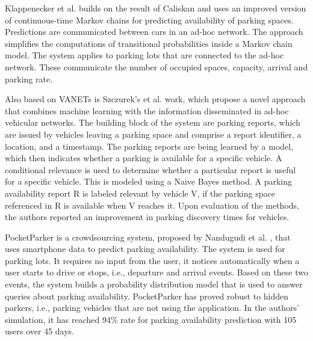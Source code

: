 Klappenecker et al. \cite{klappenecker} builds on the result of Caliskan and uses an improved version of continuous-time Markov chains for predicting availability of parking spaces. Predictions are communicated between cars in an ad-hoc network. The approach simplifies the computations of transitional probabilities inside a Markov chain model. The system applies to parking lots that are connected to the ad-hoc network. These communicate the number of occupied spaces, capacity, arrival and parking rate. 

Also based on VANETs is Szczurek's et al. \cite{szczurek} work, which propose a novel approach that combines machine learning with the information disseminated in ad-hoc vehicular networks. The building block of the system are parking reports, which are issued by vehicles leaving a parking space and comprise a report identifier, a location, and a timestamp. The parking reports are being learned by a model, which then indicates whether a parking is available for a specific vehicle. A conditional relevance is used to determine whether a particular report is useful for a specific vehicle. This is modeled using a Naive Bayes method. A parking availability report R is labeled relevant by vehicle V, if the parking space referenced in R is available when V reaches it. Upon evaluation of the methods, the authors reported an improvement in parking discovery times for vehicles.

PocketParker is a crowdsourcing system, proposed by Nandugudi et al. \cite{nandugudi}, that uses smartphone data to predict parking availability. The system is used for parking lots. It requires no input from the user, it notices automatically when a user starts to drive or stops, i.e., departure and arrival events.
Based on these two events, the system builds a probability distribution model that is used to answer queries about parking availability. PocketParker has proved robust to hidden parkers, i.e., parking vehicles that are not using the application. In the authors' simulation, it has reached 94\% rate for parking availability prediction with 105 users over 45 days.


